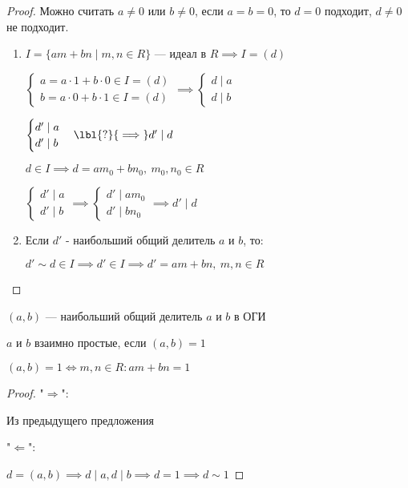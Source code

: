 \begin{proof}
    
    Можно считать $a \neq 0$ или $b \neq 0$, если $a = b = 0$, то $d = 0$ подходит, $d \neq 0$ не подходит.

    \begin{enumerate}
        \item $I = \{ am + bn \mid m, n \in R \}$ --- идеал в $R \implies I = (d)$ 
        
        $\begin{cases}
            a = a \cdot 1 + b \cdot 0 \in I = (d)\\
            b = a \cdot 0 + b \cdot 1 \in I = (d)
        \end{cases} \implies \begin{cases}
            d \mid a\\
            d \mid b
        \end{cases}$

        $\begin{cases}
            d' \mid a\\
            d' \mid b
        \end{cases} \lbl{?}{\implies} d' \mid d$

        $d \in I \implies d = a m_0 + b n_0,~m_0, n_0 \in R$

        $\begin{cases}
            d' \mid a\\
            d' \mid b
        \end{cases} \implies \begin{cases}
            d' \mid a m_0\\
            d' \mid b n_0
        \end{cases} \implies d' \mid d$

        \item Если $d'$ - наибольший общий делитель $a$ и $b$, то:
        
        $d' \sim d \in I \implies d' \in I \implies d' = am + bn,~m, n \in R$
    \end{enumerate}
\end{proof}

\begin{notice}
    $(a, b)$ --- наибольший общий делитель $a$ и $b$ в ОГИ
\end{notice}

\begin{defn}
    $a$ и $b$ взаимно простые, если $(a, b) = 1$
\end{defn}

\begin{theorem-non}
    $(a, b) = 1 \iff m, n \in R: am + bn = 1$
\end{theorem-non}

\begin{proof}

    "$\Rightarrow$":

    Из предыдущего предложения

    "$\Leftarrow$":

    $d = (a, b) \implies d \mid a, d \mid b \implies d = 1 \implies d \sim 1$
\end{proof}